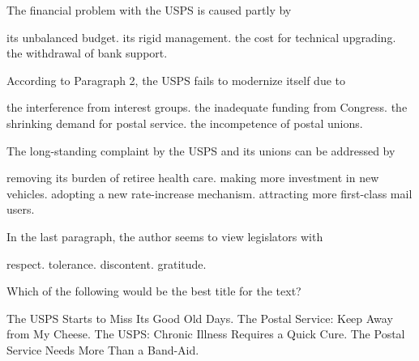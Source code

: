 \item The financial problem with the USPS is caused partly by
\begin{tasks}
	\task its unbalanced budget.
	\task its rigid management.
	\task the cost for technical upgrading.
	\task the withdrawal of bank support.
\end{tasks}
\item According to Paragraph 2, the USPS fails to modernize itself due to
\begin{tasks}
	\task the interference from interest groups.
	\task the inadequate funding from Congress.
	\task the shrinking demand for postal service.
	\task the incompetence of postal unions.
\end{tasks}
\item The long-standing complaint by the USPS and its unions can be addressed by
\begin{tasks}
	\task removing its burden of retiree health care.
	\task making more investment in new vehicles.
	\task adopting a new rate-increase mechanism.
	\task attracting more first-class mail users.
\end{tasks}
\item In the last paragraph, the author seems to view legislators with
\begin{tasks}
	\task respect.
	\task tolerance.
	\task discontent.
	\task gratitude.
\end{tasks}
\item Which of the following would be the best title for the text?
\begin{tasks}
	\task The USPS Starts to Miss Its Good Old Days.
	\task The Postal Service: Keep Away from My Cheese.
	\task The USPS: Chronic Illness Requires a Quick Cure.
	\task The Postal Service Needs More Than a Band-Aid.
\end{tasks}
